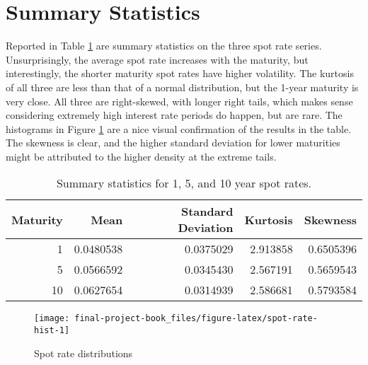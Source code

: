 \documentclass[openany]{book}
\theoremstyle{definition}
\theoremstyle{definition}
\theoremstyle{definition}
\theoremstyle{remark}
\begin{document}
\small

\normalsize

\hypertarget{summary-statistics}{%
\section{Summary Statistics}\label{summary-statistics}}

Reported in Table \ref{tab:spot-rate-summary} are summary statistics on
the three spot rate series. Unsurprisingly, the average spot rate
increases with the maturity, but interestingly, the shorter maturity
spot rates have higher volatility. The kurtosis of all three are less
than that of a normal distribution, but the 1-year maturity is very
close. All three are right-skewed, with longer right tails, which makes
sense considering extremely high interest rate periods do happen, but
are rare. The histograms in Figure \ref{fig:spot-rate-hist} are a nice
visual confirmation of the results in the table. The skewness is clear,
and the higher standard deviation for lower maturities might be
attributed to the higher density at the extreme tails.

\small

\begin{table}[H]

\caption{\label{tab:spot-rate-summary}Summary statistics for 1, 5, and 10 year spot rates.}
\centering
\begin{tabular}[t]{rrrrr}
\toprule
Maturity & Mean & Standard Deviation & Kurtosis & Skewness\\
\midrule
1 & 0.0480538 & 0.0375029 & 2.913858 & 0.6505396\\
5 & 0.0566592 & 0.0345430 & 2.567191 & 0.5659543\\
10 & 0.0627654 & 0.0314939 & 2.586681 & 0.5793584\\
\bottomrule
\end{tabular}
\end{table}

\normalsize

\small

\begin{figure}[H]

{\centering \texttt{[image: final-project-book\_files/figure-latex/spot-rate-hist-1]} 

}

\caption{Spot rate distributions}\label{fig:spot-rate-hist}
\end{figure}

\normalsize
\end{document}
